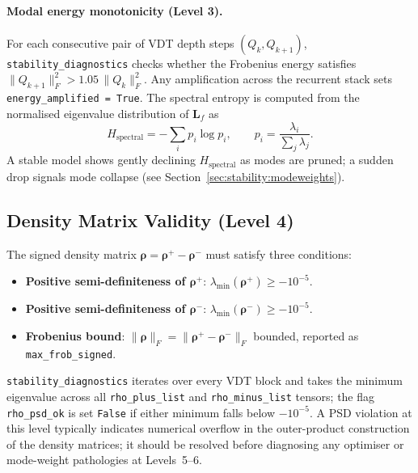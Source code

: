 \documentclass[11pt,a4paper]{article}
\newcommand{\Lmat}{\mathbf{L}}
\begin{document}
\paragraph{Modal energy monotonicity (Level 3).}
For each consecutive pair of VDT depth steps $(Q_k, Q_{k+1})$,
\texttt{stability\_diagnostics} checks whether the Frobenius energy satisfies
$\|Q_{k+1}\|_F^2 > 1.05\,\|Q_k\|_F^2$.
Any amplification across the recurrent stack sets \texttt{energy\_amplified = True}.
The spectral entropy is computed from the normalised eigenvalue distribution
of $\Lmat_f$ as
\begin{equation}
  H_{\text{spectral}}
  = -\sum_i p_i \log p_i, \qquad
  p_i = \frac{\lambda_i}{\sum_j \lambda_j}.
  \label{eq:spectral-entropy-diag}
\end{equation}
A stable model shows gently declining $H_{\text{spectral}}$ as modes are pruned;
a sudden drop signals mode collapse (see Section~\ref{sec:stability:modeweights}).


\subsection{Density Matrix Validity (Level 4)}
\label{sec:stability:rho}

The signed density matrix $\boldsymbol{\rho} = \boldsymbol{\rho}^+ - \boldsymbol{\rho}^-$
must satisfy three conditions:
\begin{itemize}
  \item \textbf{Positive semi-definiteness of $\boldsymbol{\rho}^+$}:
        $\lambda_{\min}(\boldsymbol{\rho}^+) \geq -10^{-5}$.
  \item \textbf{Positive semi-definiteness of $\boldsymbol{\rho}^-$}:
        $\lambda_{\min}(\boldsymbol{\rho}^-) \geq -10^{-5}$.
  \item \textbf{Frobenius bound}: $\|\boldsymbol{\rho}\|_F =
        \|\boldsymbol{\rho}^+ - \boldsymbol{\rho}^-\|_F$ bounded,
        reported as \texttt{max\_frob\_signed}.
\end{itemize}
\texttt{stability\_diagnostics} iterates over every VDT block and takes the
minimum eigenvalue across all \texttt{rho\_plus\_list} and
\texttt{rho\_minus\_list} tensors; the flag \texttt{rho\_psd\_ok} is set
\texttt{False} if either minimum falls below $-10^{-5}$.
A PSD violation at this level typically indicates numerical overflow in the
outer-product construction of the density matrices; it should be resolved
before diagnosing any optimiser or mode-weight pathologies at Levels~5--6.
\end{document}
